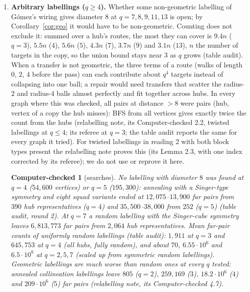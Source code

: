 \documentclass[11pt]{amsart}
\theoremstyle{plain}
\newtheorem{computer}{Computer-checked}
\theoremstyle{definition}
\theoremstyle{remark}
\begin{document}
\begin{enumerate}[leftmargin=1.5em]
\item \textbf{Arbitrary labellings ($q \ge 4$).} Whether some non-geometric labelling of Gómez's wiring gives diameter $8$
  at $q = 7, 8, 9, 11, 13$ is open; by Corollary~\ref{cor:geo} it would have to be non-geometric. Counting does not
  exclude it: summed over a hub's routes, the most they can cover is $9.4n$ ($q = 3$), $5.5n$ ($4$), $5.6n$ ($5$),
  $4.3n$ ($7$), $3.7n$ ($9$) and $3.1n$ ($13$), $n$ the number of targets in the copy, so the union bound stays near $3$
  as $q$ grows (table audit). When a transfer is not geometric, the three terms of a route (walks of length $0$, $2$,
  $4$ before the pass) can each contribute about $q^4$ targets instead of collapsing into one ball; a repair would need
  transfers that scatter the radius-$2$ and radius-$4$ balls almost perfectly and fit together across hubs. In every
  graph where this was checked, all pairs at distance $> 8$ were pairs (hub, vertex of a copy the hub misses): BFS from all
  vertices gives exactly twice the count from the hubs (relabelling note, its Computer-checked 2.2, twisted labellings
  at $q \le 4$; its referee at $q = 3$; the table audit reports the same for every graph it tried). For twisted
  labellings in reading 2 with both block types present the relabelling note proves this (its Lemma 2.3, with one index
  corrected by its referee); we do not use or reprove it here.

  \begin{computer}[searches]\label{cc:searches}
  No labelling with diameter $8$ was found at $q = 4$ ($54{,}600$ vertices) or $q = 5$ ($195{,}300$): annealing with a
  Singer-type symmetry and eight squad variants ended at $12{,}075$--$13{,}900$ far pairs from $390$ hub
  representatives ($q = 4$) and $35{,}500$--$38{,}000$ from $252$ ($q = 5$) (table audit, round 2). At $q = 7$ a random
  labelling with the Singer-cube symmetry leaves $6{,}813{,}773$ far pairs from $2{,}064$ hub representatives. Mean
  far-pair counts of uniformly random labellings (table audit): $1{,}911$ at $q = 3$ and $645{,}753$ at $q = 4$ (all
  hubs, fully random), and about $70$, $6.55\cdot10^6$ and $6.5\cdot10^8$ at $q = 2, 5, 7$ (scaled up from symmetric
  random labellings). Geometric labellings are much worse than random ones at every $q$ tested: annealed collineation
  labellings leave $805$ ($q = 2$), $259{,}169$ ($3$), $18.2\cdot10^6$ ($4$) and $209\cdot10^6$ ($5$) far pairs
  (relabelling note, its Computer-checked 4.7).
  \end{computer}


\end{enumerate}
\end{document}
